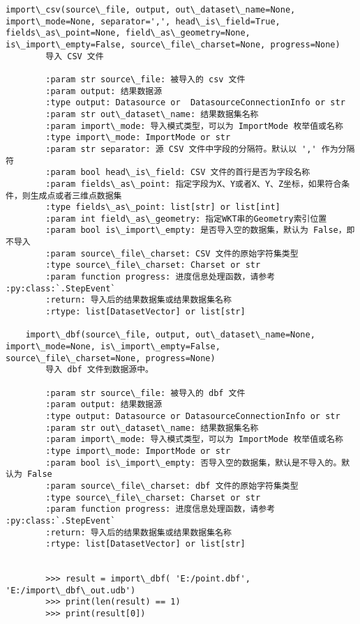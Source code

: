 \documentclass[11pt]{article}
\begin{document}
\begin{Verbatim}[commandchars=\\\{\}]
    import\_csv(source\_file, output, out\_dataset\_name=None, import\_mode=None, separator=',', head\_is\_field=True, fields\_as\_point=None, field\_as\_geometry=None, is\_import\_empty=False, source\_file\_charset=None, progress=None)
        导入 CSV 文件
        
        :param str source\_file: 被导入的 csv 文件
        :param output: 结果数据源
        :type output: Datasource or  DatasourceConnectionInfo or str
        :param str out\_dataset\_name: 结果数据集名称
        :param import\_mode: 导入模式类型，可以为 ImportMode 枚举值或名称
        :type import\_mode: ImportMode or str
        :param str separator: 源 CSV 文件中字段的分隔符。默认以 ',' 作为分隔符
        :param bool head\_is\_field: CSV 文件的首行是否为字段名称
        :param fields\_as\_point: 指定字段为X、Y或者X、Y、Z坐标，如果符合条件，则生成点或者三维点数据集
        :type fields\_as\_point: list[str] or list[int]
        :param int field\_as\_geometry: 指定WKT串的Geometry索引位置
        :param bool is\_import\_empty: 是否导入空的数据集，默认为 False，即不导入
        :param source\_file\_charset: CSV 文件的原始字符集类型
        :type source\_file\_charset: Charset or str
        :param function progress: 进度信息处理函数，请参考 :py:class:`.StepEvent`
        :return: 导入后的结果数据集或结果数据集名称
        :rtype: list[DatasetVector] or list[str]
    
    import\_dbf(source\_file, output, out\_dataset\_name=None, import\_mode=None, is\_import\_empty=False, source\_file\_charset=None, progress=None)
        导入 dbf 文件到数据源中。
        
        :param str source\_file: 被导入的 dbf 文件
        :param output: 结果数据源
        :type output: Datasource or DatasourceConnectionInfo or str
        :param str out\_dataset\_name: 结果数据集名称
        :param import\_mode: 导入模式类型，可以为 ImportMode 枚举值或名称
        :type import\_mode: ImportMode or str
        :param bool is\_import\_empty: 否导入空的数据集，默认是不导入的。默认为 False
        :param source\_file\_charset: dbf 文件的原始字符集类型
        :type source\_file\_charset: Charset or str
        :param function progress: 进度信息处理函数，请参考 :py:class:`.StepEvent`
        :return: 导入后的结果数据集或结果数据集名称
        :rtype: list[DatasetVector] or list[str]
        
        
        >>> result = import\_dbf( 'E:/point.dbf', 'E:/import\_dbf\_out.udb')
        >>> print(len(result) == 1)
        >>> print(result[0])
    

\end{Verbatim}
\end{document}
